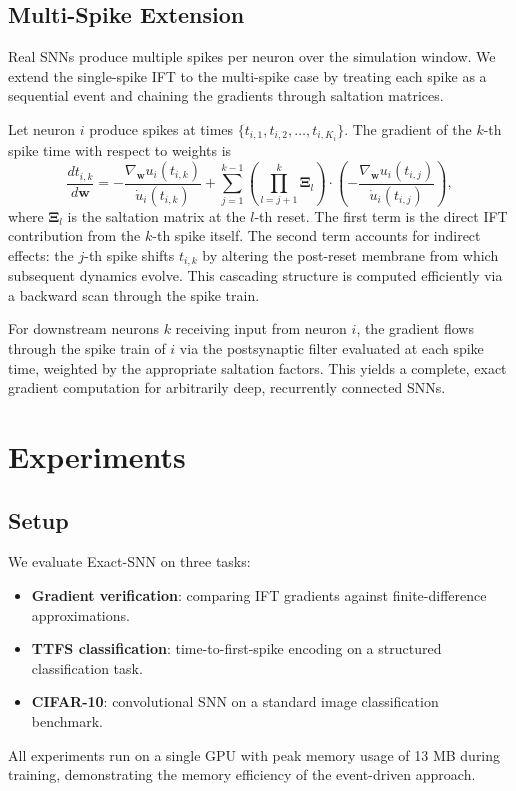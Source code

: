 \documentclass[10pt,twocolumn]{article}
\begin{document}
\subsection{Multi-Spike Extension}

Real SNNs produce multiple spikes per neuron over the simulation window. We extend the single-spike IFT to the multi-spike case by treating each spike as a sequential event and chaining the gradients through saltation matrices.

Let neuron $i$ produce spikes at times $\{t_{i,1}, t_{i,2}, \ldots, t_{i,K_i}\}$. The gradient of the $k$-th spike time with respect to weights is
\begin{equation}
    \frac{dt_{i,k}}{d\mathbf{w}} = -\frac{\nabla_\mathbf{w} u_i(t_{i,k})}{\dot{u}_i(t_{i,k})} + \sum_{j=1}^{k-1} \left(\prod_{l=j+1}^{k} \mathbf{\Xi}_l\right) \cdot \left(-\frac{\nabla_\mathbf{w} u_i(t_{i,j})}{\dot{u}_i(t_{i,j})}\right),
    \label{eq:multi_spike}
\end{equation}
where $\mathbf{\Xi}_l$ is the saltation matrix at the $l$-th reset. The first term is the direct IFT contribution from the $k$-th spike itself. The second term accounts for indirect effects: the $j$-th spike shifts $t_{i,k}$ by altering the post-reset membrane from which subsequent dynamics evolve. This cascading structure is computed efficiently via a backward scan through the spike train.

For downstream neurons $k$ receiving input from neuron $i$, the gradient flows through the spike train of $i$ via the postsynaptic filter evaluated at each spike time, weighted by the appropriate saltation factors. This yields a complete, exact gradient computation for arbitrarily deep, recurrently connected SNNs.

\section{Experiments}

\subsection{Setup}

We evaluate Exact-SNN on three tasks:
\begin{itemize}
    \item \textbf{Gradient verification}: comparing IFT gradients against finite-difference approximations.
    \item \textbf{TTFS classification}: time-to-first-spike encoding on a structured classification task.
    \item \textbf{CIFAR-10}: convolutional SNN on a standard image classification benchmark.
\end{itemize}
All experiments run on a single GPU with peak memory usage of 13 MB during training, demonstrating the memory efficiency of the event-driven approach.
\end{document}
